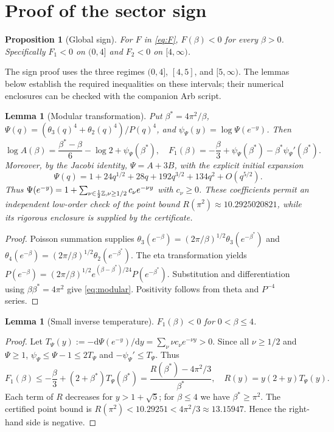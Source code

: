\documentclass[10pt,a4paper]{article}
\numberwithin{equation}{section}
\newtheorem{lemma}[theorem]{Lemma}\newtheorem{proposition}[theorem]{Proposition}
\theoremstyle{remark}\newtheorem{remark}[theorem]{Remark}\newtheorem{question}[theorem]{Question}
\newcommand{\dd}{\mathrm d}
\begin{document}
\section{Proof of the sector sign}\label{app:sign}
\begin{proposition}[Global sign]\label{prop:sign}
For $F$ in \eqref{eq:F}, $F(\beta)<0$ for every $\beta>0$. Specifically $F_1<0$ on $(0,4]$ and $F_2<0$ on $[4,\infty)$.
\end{proposition}
The sign proof uses the three regimes $(0,4]$, $[4,5]$, and $[5,\infty)$. The lemmas below establish the required inequalities on these intervals; their numerical enclosures can be checked with the companion Arb script.
\begin{lemma}[Modular transformation]\label{lem:modular}
Put $\beta^*=4\pi^2/\beta$, $\Psi(q)=(\theta_3(q)^4+\theta_2(q)^4)/P(q)^4$, and $\psi_{\Psi}(y)=\log\Psi(e^{-y})$. Then
\begin{equation}\label{eq:modular}
\log A(\beta)=\frac{\beta^*-\beta}{6}-\log2+\psi_{\Psi}(\beta^*),\quad
F_1(\beta)=-\frac\beta3+\psi_{\Psi}(\beta^*)-\beta^*\psi_{\Psi}'(\beta^*).
\end{equation}
Moreover, by the Jacobi identity, $\Psi=A+3B$, with the explicit initial expansion
\[
\Psi(q)=1+24q^{1/2}+28q+192q^{3/2}+134q^2+O(q^{5/2}).
\]
Thus $\Psi(e^{-y})=1+\sum_{\nu\in\frac12\mathbb Z,\nu\ge1/2}c_\nu e^{-\nu y}$ with $c_\nu\ge0$. These coefficients permit an independent low-order check of the point bound $R(\pi^2)\approx10.2925020821$, while its rigorous enclosure is supplied by the certificate.
\end{lemma}
\begin{proof}Poisson summation supplies $\theta_3(e^{-\beta})=(2\pi/\beta)^{1/2}\theta_3(e^{-\beta^*})$ and $\theta_4(e^{-\beta})=(2\pi/\beta)^{1/2}\theta_2(e^{-\beta^*})$. The eta transformation yields $P(e^{-\beta})=(2\pi/\beta)^{1/2}e^{(\beta-\beta^*)/24}P(e^{-\beta^*})$. Substitution and differentiation using $\beta\beta^*=4\pi^2$ give \eqref{eq:modular}. Positivity follows from theta and $P^{-4}$ series.\end{proof}
\begin{lemma}[Small inverse temperature]\label{lem:small}
$F_1(\beta)<0$ for $0<\beta\le4$.
\end{lemma}
\begin{proof}Let $T_{\Psi}(y):=-\dd\Psi(e^{-y})/\dd y=\sum_\nu \nu c_\nu e^{-\nu y}>0$. Since all $\nu\ge1/2$ and $\Psi\ge1$, $\psi_{\Psi}\le\Psi-1\le2T_{\Psi}$ and $-\psi_{\Psi}'\le T_{\Psi}$. Thus
\[
F_1(\beta)\le-\frac\beta3+(2+\beta^*)T_{\Psi}(\beta^*)
=\frac{R(\beta^*)-4\pi^2/3}{\beta^*},\quad R(y)=y(2+y)T_{\Psi}(y).
\]
Each term of $R$ decreases for $y>1+\sqrt5$; for $\beta\le4$ we have $\beta^*\ge\pi^2$. The certified point bound is $R(\pi^2)<10.29251<4\pi^2/3\approx13.15947$. Hence the right-hand side is negative.\end{proof}
\end{document}
